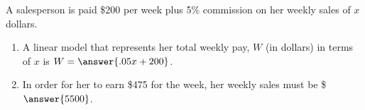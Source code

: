 \documentclass{ximera}
\author{Kenneth Berglund}
\begin{document}
\begin{exercise}
\licenseSZ

A salesperson is paid \$200 per week plus 5\% commission on her weekly sales of $x$ dollars.


\begin{enumerate}
\item A linear model that represents her total weekly pay, $W$ (in dollars) in terms of $x$ is $W = \answer{.05x + 200}$.

\item In order for her to earn \$475 for the week, her weekly sales must be \$$\answer{5500}$.


	
\end{enumerate}

\end{exercise}
\end{document}
